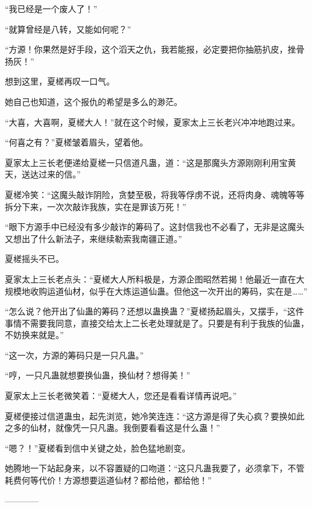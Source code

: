 \begin{this_body}
“我已经是一个废人了！”

“就算曾经是八转，又能如何呢？”

“方源！你果然是好手段，这个滔天之仇，我若能报，必定要把你抽筋扒皮，挫骨扬灰！”

想到这里，夏槎再叹一口气。

她自己也知道，这个报仇的希望是多么的渺茫。

“大喜，大喜啊，夏槎大人！”就在这个时候，夏家太上三长老兴冲冲地跑过来。

“何喜之有？”夏槎皱着眉头，望着他。

夏家太上三长老便递给夏槎一只信道凡蛊，道：“这是那魔头方源刚刚利用宝黄天，送达过来的信。”

夏槎冷笑：“这魔头敲诈阴险，贪婪至极，将我等俘虏不说，还将肉身、魂魄等等拆分下来，一次次敲诈我族，实在是罪该万死！”

“眼下方源手中已经没有多少敲诈的筹码了。这封信我也不必看了，无非是这魔头又想出了什么新法子，来继续勒索我南疆正道。”

夏槎摇头不已。

夏家太上三长老点头：“夏槎大人所料极是，方源企图昭然若揭！他最近一直在大规模地收购运道仙材，似乎在大炼运道仙蛊。但他这一次开出的筹码，实在是……”

“怎么说？他开出了仙蛊的筹码？还想以蛊换蛊？”夏槎扬起眉头，又摆手，“这件事情不需要我同意，直接交给太上二长老处理就是了。只要是有利于我族的仙蛊，不妨换来就是。”

“这一次，方源的筹码只是一只凡蛊。”

“哼，一只凡蛊就想要换仙蛊，换仙材？想得美！”

夏家太上三长老微笑着：“夏槎大人，您还是看看详情再说吧。”

夏槎便接过信道蛊虫，起先浏览，她冷笑连连：“这方源是得了失心疯？要换如此之多的仙材，就像凭一只凡蛊。我倒要看看这是什么蛊！”

“嗯？！”夏槎看到信中关键之处，脸色猛地剧变。

她腾地一下站起身来，以不容置疑的口吻道：“这只凡蛊我要了，必须拿下，不管耗费何等代价！方源想要运道仙材？都给他，都给他！”

------------

\end{this_body}

